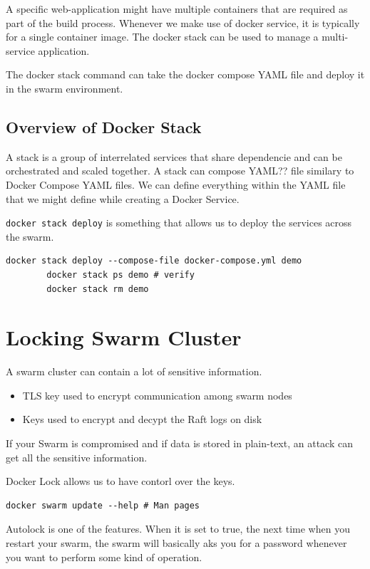 \documentclass[11pt]{book}
\begin{document}
    A specific web-application might have multiple containers that are required as part of the build process.
    Whenever we make use of docker service, it is typically for a single container image.
    The docker stack can be used to manage a multi-service application.

    The docker stack command can take the docker compose YAML file and deploy it in the swarm environment.

    \subsection{Overview of Docker Stack}
    A stack is a group of interrelated services that share dependencie and can be orchestrated and scaled together.
    A stack can compose YAML?? file similary to Docker Compose YAML files.
    We can define everything within the YAML file that we might define while creating a Docker Service.

    \texttt{docker stack deploy} is something that allows us to deploy the services across the swarm.

    \begin{lstlisting}[style=terminal]
        docker stack deploy --compose-file docker-compose.yml demo
        docker stack ps demo # verify
        docker stack rm demo
    \end{lstlisting}

    \section{Locking Swarm Cluster}
    A swarm cluster can contain a lot of sensitive information.
    \begin{itemize}
        \item TLS key used to encrypt communication among swarm nodes
        \item Keys used to encrypt and decypt the Raft logs on disk
    \end{itemize}

    If your Swarm is compromised and if data is stored in plain-text, an attack can get all the sensitive information.

    Docker Lock allows us to have contorl over the keys.

    \begin{lstlisting}[style=terminal]
        docker swarm update --help # Man pages
    \end{lstlisting}

    Autolock is one of the features.
    When it is set to true, the next time when you restart your swarm, the swarm will basically aks you for a password whenever you want to perform some kind of operation.
\end{document}
